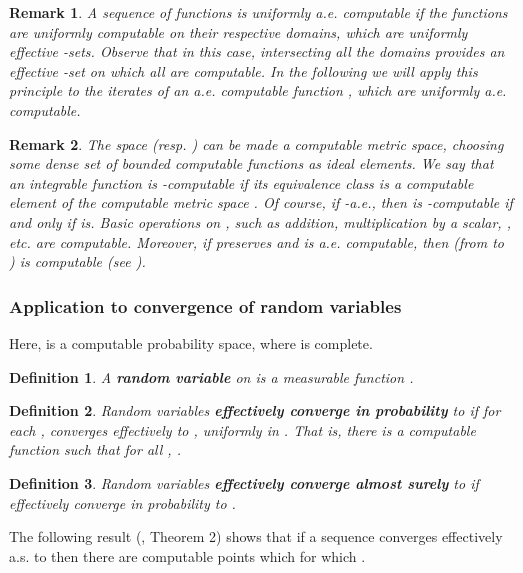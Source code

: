 \documentclass[copyright,creativecommons]{eptcs}
\newtheorem{definition}{Definition}
\newtheorem{remark}{Remark}
\numberwithin{equation}{section}
\begin{document}
\begin{remark}
\label{com_sum} A sequence of functions  is uniformly a.e. computable
if the functions are uniformly computable on their respective domains, which
are uniformly effective -sets. Observe that in this case,
intersecting all the domains provides an effective -set on
which all  are computable. In the following we will apply this
principle to the iterates  of an a.e. computable function , which are uniformly a.e. computable.
\end{remark}

\begin{remark}\label{l1comp}
The space  (resp. ) can be made a computable metric
space, choosing some dense set of bounded computable functions as ideal
elements. We say that an integrable function 
is -computable if its equivalence class is a computable element
of the computable metric space . Of course, if  -a.e.,
then  is -computable if and only if  is. Basic operations
on , such as addition, multiplication by a scalar, ,  etc. are computable. Moreover, if  preserves  and  is a.e. computable, then  (from  to ) is computable  (see \cite{HoyRojCiE09}).
\end{remark}

\subsubsection{Application to convergence of random variables}

Here,  is a computable probability space, where  is complete.

\begin{definition}
A \textbf{\emph{random variable}} on  is a measurable function .
\end{definition}

\begin{definition}
Random variables  \textbf{\emph{effectively converge in probability}}
to  if for each , 
converges effectively to , uniformly in . That is, there is a
computable function  such that for all , .
\end{definition}

\begin{definition}
\label{def_rec_conv}Random variables  \textbf{\emph{effectively
converge almost surely}} to  if 
effectively converge in probability to .
\end{definition}

The following result (\cite{GHR07}, Theorem 2) shows that if a sequence  converges effectively a.s. to  then there are computable points
which for which .
\end{document}

